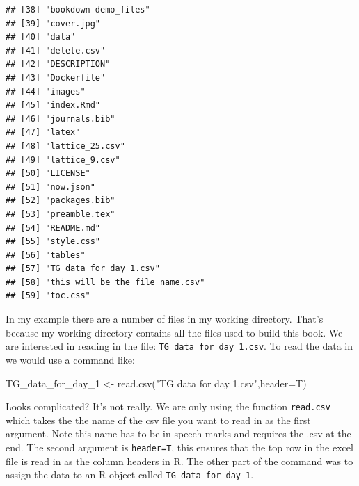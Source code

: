 \documentclass[
]{book}
\newenvironment{Shaded}{\begin{snugshade}}{\end{snugshade}}
\newcommand{\AttributeTok}[1]{\textcolor[rgb]{0.77,0.63,0.00}{#1}}
\newcommand{\FunctionTok}[1]{\textcolor[rgb]{0.00,0.00,0.00}{#1}}
\newcommand{\NormalTok}[1]{#1}
\newcommand{\OtherTok}[1]{\textcolor[rgb]{0.56,0.35,0.01}{#1}}
\newcommand{\StringTok}[1]{\textcolor[rgb]{0.31,0.60,0.02}{#1}}
\begin{document}
\begin{verbatim}
## [38] "bookdown-demo_files"                                
## [39] "cover.jpg"                                          
## [40] "data"                                               
## [41] "delete.csv"                                         
## [42] "DESCRIPTION"                                        
## [43] "Dockerfile"                                         
## [44] "images"                                             
## [45] "index.Rmd"                                          
## [46] "journals.bib"                                       
## [47] "latex"                                              
## [48] "lattice_25.csv"                                     
## [49] "lattice_9.csv"                                      
## [50] "LICENSE"                                            
## [51] "now.json"                                           
## [52] "packages.bib"                                       
## [53] "preamble.tex"                                       
## [54] "README.md"                                          
## [55] "style.css"                                          
## [56] "tables"                                             
## [57] "TG data for day 1.csv"                              
## [58] "this will be the file name.csv"                     
## [59] "toc.css"
\end{verbatim}

In my example there are a number of files in my working directory. That's because my working directory contains all the files used to build this book. We are interested in reading in the file: \texttt{TG\ data\ for\ day\ 1.csv}. To read the data in we would use a command like:

\begin{Shaded}
\begin{Highlighting}[]
\NormalTok{TG\_data\_for\_day\_1 }\OtherTok{\textless{}{-}} \FunctionTok{read.csv}\NormalTok{(}\StringTok{"TG data for day 1.csv"}\NormalTok{,}\AttributeTok{header=}\NormalTok{T)}
\end{Highlighting}
\end{Shaded}

Looks complicated? It's not really. We are only using the function \texttt{read.csv} which takes the the name of the csv file you want to read in as the first argument. Note this name has to be in speech marks and requires the .csv at the end. The second argument is \texttt{header=T}, this ensures that the top row in the excel file is read in as the column headers in R. The other part of the command was to assign the data to an R object called \texttt{TG\_data\_for\_day\_1}.
\end{document}
